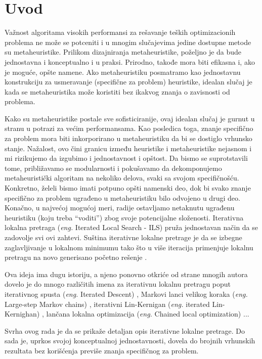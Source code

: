 \documentclass[a4paper]{article}
\newcommand{\q}[1]{``#1''}  %
\newcommand{\eng}[1]{(\textit{eng.} #1)}
\begin{document}
\section{Uvod}
\label{sec:uvod}


Važnost algoritama visokih performansi za rešavanje teških optimizacionih problema ne može se potceniti i u mnogim slučajevima jedine dostupne metode su metaheuristike. Prilikom dizajniranja metaheuristike, poželjno je da bude jednostavna i konceptualno i u praksi. Prirodno, takođe mora biti efikasna i, ako je moguće, opšte namene. Ako metaheuristiku posmatramo kao
jednostavnu konstrukciju za usmeravanje (specifične za problem) heuristike, idealan slučaj je kada se metaheuristika može koristiti bez ikakvog znanja o zavisnosti od problema.\par
Kako su metaheuristike postale sve sofisticiranije, ovaj idealan slučaj je gurnut u stranu u potrazi za većim performansama. Kao posledica toga, znanje specifično za problem mora biti inkorporirano u metaheuristiku da bi se dostiglo vrhunsko stanje. Nažalost, ovo čini granicu između heuristike i metaheuristike nejasnom i mi rizikujemo da izgubimo i jednostavnost i opštost. Da bismo se suprotstavili tome, približavamo se modularnosti i pokušavamo da dekomponujemo metaheuristički algoritam na nekoliko delova, svaki sa svojom specifičnošću.
Konkretno, želeli bismo imati potpuno opšti namenski deo, dok bi svako znanje specifično za problem ugrađeno u metaheuristiku bilo odvojeno u drugi deo. Konačno, u najvećoj mogućoj meri, radije ostavljamo netaknutu ugrađenu heuristiku (koju treba \q{voditi}) zbog svoje potencijalne složenosti. Iterativna lokalna pretraga \eng{Iterated Local Search - ILS} pruža jednostavan način da se zadovolje svi ovi zahtevi. Suština iterativne lokalne pretrage je da se izbegne zaglavljivanje u lokalnom minimumu tako što u više iteracija primenjuje lokalnu pretragu na novo generisano početno rešenje \cite{handbookOfMetaheuristics}. \par
Ova ideja ima dugu istoriju, a njeno ponovno otkriće od strane mnogih autora dovelo je do mnogo različitih imena za iterativnu lokalnu pretragu poput iterativnog spusta \eng{Iterated Descent} \cite{baum1986iterated, baum1986towards}, Markovi lanci velikog koraka \eng{Large-step Markov chains} \cite{largeStepMarkovChains}, iterativni Lin-Kernigan \eng{iterated Lin-Kernighan} \cite{iteratedLinKernighan}, lančana lokalna optimizacija \eng{Chained local optimization} \cite{chainedLocalOptimization}...\par
Svrha ovog rada je da se prikaže detaljan opis iterativne lokalne pretrage. Do sada je, uprkos svojoj konceptualnoj jednostavnosti, dovela do brojnih vrhunskih rezultata bez korišćenja previše znanja specifičnog za problem.\par
\end{document}
